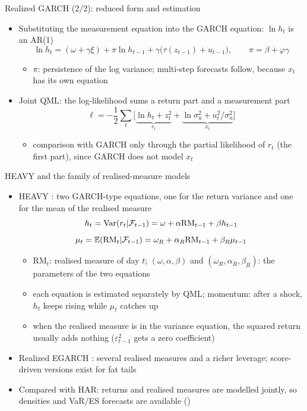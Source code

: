 \begin{frame}{Realized GARCH (2/2): reduced form and estimation}
\itemsize{\small}
\begin{itemize}
    \item Substituting the measurement equation into the GARCH equation: $\ln h_t$ is an AR(1)
    \[ \ln h_t = (\omega + \gamma\xi) + \pi\ln h_{t-1} + \gamma\big(\tau(z_{t-1}) + u_{t-1}\big), \qquad \pi = \beta + \varphi\gamma \]
    \begin{itemize}
        \item $\pi$: persistence of the log variance; multi-step forecasts follow, because $x_t$ has its own equation
    \end{itemize}
    \item Joint QML: the log-likelihood sums a return part and a measurement part
    \[ \ell = -\frac12\sum_t\Big[\underbrace{\ln h_t + z_t^2}_{r_t} + \underbrace{\ln\sigma^2_u + u_t^2/\sigma^2_u}_{x_t}\Big] \]
    \begin{itemize}
        \item comparison with GARCH only through the partial likelihood of $r_t$ (the first part), since GARCH does not model $x_t$
    \end{itemize}
\end{itemize}
\end{frame}

\begin{frame}{HEAVY and the family of realised-measure models}
\itemsize{\footnotesize}
\begin{itemize}
    \item HEAVY : two GARCH-type equations, one for the return variance and one for the mean of the realised measure
    \[ h_t = \text{Var}(r_t | \mathcal F_{t-1}) = \omega + \alpha\mathrm{RM}_{t-1} + \beta h_{t-1} \]
    \[ \mu_t = \mathbb{E}(\mathrm{RM}_t | \mathcal F_{t-1}) = \omega_R + \alpha_R\mathrm{RM}_{t-1} + \beta_R\mu_{t-1} \]
    \begin{itemize}
        \item $\mathrm{RM}_t$: realised measure of day $t$; $(\omega, \alpha, \beta)$ and $(\omega_R, \alpha_R, \beta_R)$: the parameters of the two equations
        \item each equation is estimated separately by QML; momentum: after a shock, $h_t$ keeps rising while $\mu_t$ catches up
        \item when the realised measure is in the variance equation, the squared return usually adds nothing ($\varepsilon^2_{t-1}$ gets a zero coefficient)
    \end{itemize}
    \item Realized EGARCH : several realised measures and a richer leverage; score-driven versions exist for fat tails
    \item Compared with HAR: returns and realised measures are modelled jointly, so densities and VaR/ES forecasts are available ()
\end{itemize}
\end{frame}

